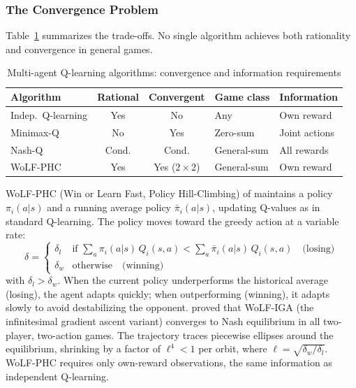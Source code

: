 \subsubsection{The Convergence Problem}

Table~\ref{tab:marl_comparison} summarizes the trade-offs. No single algorithm achieves both rationality and convergence in general games.

\begin{table}[htbp]
\centering
\caption{Multi-agent Q-learning algorithms: convergence and information requirements}
\label{tab:marl_comparison}
\begin{tabular}{l cc ll}
\hline
Algorithm & Rational & Convergent & Game class & Information \\
\hline
Indep.\ Q-learning & Yes & No & Any & Own reward \\
Minimax-Q & No & Yes & Zero-sum & Joint actions \\
Nash-Q & Cond. & Cond. & General-sum & All rewards \\
WoLF-PHC & Yes & Yes ($2{\times}2$) & General-sum & Own reward \\
\hline
\end{tabular}
\end{table}

WoLF-PHC (Win or Learn Fast, Policy Hill-Climbing) of \citet{BowlingVeloso2002} maintains a policy $\pi_i(a|s)$ and a running average policy $\bar{\pi}_i(a|s)$, updating Q-values as in standard Q-learning. The policy moves toward the greedy action at a variable rate:
\begin{equation}
\delta = \begin{cases}
\delta_l & \text{if } \sum_a \pi_i(a|s)\, Q_i(s,a) < \sum_a \bar{\pi}_i(a|s)\, Q_i(s,a) \quad \text{(losing)} \\
\delta_w & \text{otherwise} \quad \text{(winning)}
\end{cases}
\end{equation}
with $\delta_l > \delta_w$. When the current policy underperforms the historical average (losing), the agent adapts quickly; when outperforming (winning), it adapts slowly to avoid destabilizing the opponent. \citet{BowlingVeloso2002} proved that WoLF-IGA (the infinitesimal gradient ascent variant) converges to Nash equilibrium in all two-player, two-action games. The trajectory traces piecewise ellipses around the equilibrium, shrinking by a factor of $\ell^4 < 1$ per orbit, where $\ell = \sqrt{\delta_w / \delta_l}$. WoLF-PHC requires only own-reward observations, the same information as independent Q-learning.

